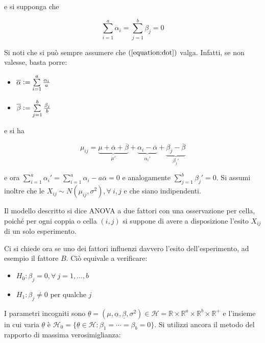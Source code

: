 \documentclass[hidelinks, 10pt]{article}
\begin{document}
e si supponga che

\begin{equation} \label{equation:dot}
\sum\limits_{i = 1}^{a} \alpha_{i} = \sum\limits_{j = 1}^{b} \beta_{j} = 0
\end{equation}

Si noti che si pu\`o sempre assumere che $ (\ref{equation:dot}) $ valga. Infatti, se non valesse, basta porre:

\begin{itemize}
\item $ \overline{\alpha} \vcentcolon= \sum\limits_{i = 1}^{a} \frac{\alpha_{i}}{a} $
\item $ \overline{\beta} \vcentcolon= \sum\limits_{j = 1}^{b} \frac{\beta_{j}}{b} $
\end{itemize}

e si ha

\[ \mu_{ij} = \underbrace{\mu + \overline{\alpha} + \overline{\beta}}_{\mu'} + \underbrace{\alpha_{i} - \overline{\alpha}}_{\alpha_{i}'} + \underbrace{\beta_{j} - \overline{\beta}}_{\beta_{j}'}  \]

e ora $ \sum\limits_{i = 1}^{a} \alpha_{i}' = \sum\limits_{i = 1}^{a} \alpha_{i} - a \overline{\alpha} = 0 $ e analogamente $ \sum\limits_{j = 1}^{b} \beta_{j}' = 0 $. Si assumi inoltre che le $ X_{ij} \sim N(\mu_{ij}, \sigma^{2}), \forall\ i, j $ e che siano indipendenti.

Il modello descritto si dice ANOVA a due fattori con una osservazione per cella, poich\'e per ogni coppia o cella $ (i, j) $ si suppone di avere a disposizione l'esito $ X_{ij} $ di un solo esperimento.

Ci si chiede ora se uno dei fattori influenzi davvero l'esito dell'esperimento, ad esempio il fattore $ B $. Ci\`o equivale a verificare:

\begin{itemize}
\item $ H_{0}: \beta_{j} = 0, \forall\ j = 1, \dotsc, b $
\item $ H_{1}: \beta_{j} \ne 0 $ per qualche $ j $
\end{itemize}

I parametri incogniti sono $ \underline{\theta} = (\mu, \underline{\alpha}, \underline{\beta}, \sigma^{2}) \in \mathcal{H} = \mathbb{R} \times \mathbb{R}^{a} \times \mathbb{R}^{b} \times \mathbb{R}^{+} $ e l'insieme in cui varia $ \underline{\theta} $ \`e $ \mathcal{H}_{0} = \{ \underline{\theta} \in \mathcal{H} : \beta_{1} = \dotsb = \beta_{b} = 0 \} $. Si utilizzi ancora il metodo del rapporto di massima verosimiglianza:
\end{document}
